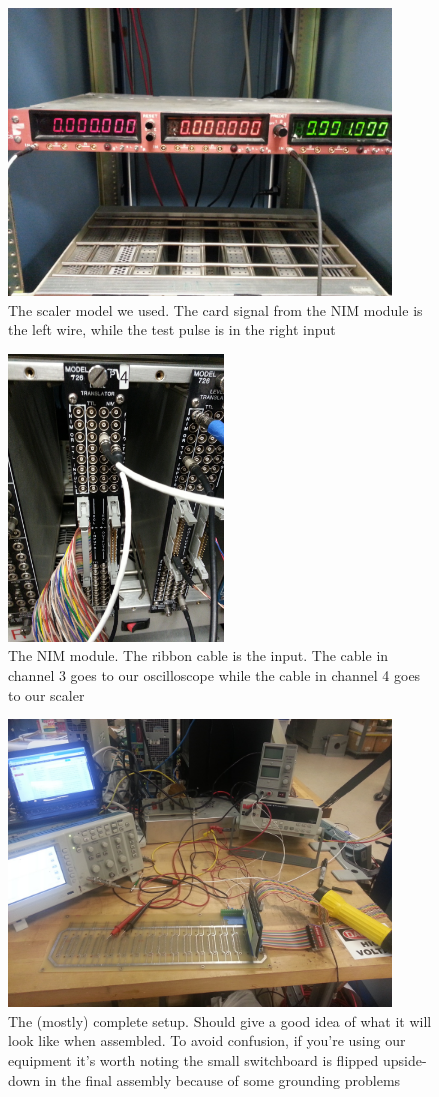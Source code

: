 \documentclass[final]{report}
\begin{document}
\begin{figure}[3]
  \centering
  \includegraphics[height=3in]{Figure3.jpg}
  \caption{The scaler model we used. The card signal from the NIM module is the left wire, while the test pulse is in the right input}
  \label{fig:scaler}
\end{figure}
\begin{figure}[4]
  \centering
  \includegraphics[height=3in, angle = -90]{Figure4.jpg}
  \caption{The NIM module. The ribbon cable is the input. The cable in channel 3 goes to our oscilloscope while the cable in channel 4 goes to our scaler}
  \label{fig:nimboard}
\end{figure}
\begin{figure}[5]
  \centering
  \includegraphics[height=3in]{Figure5.jpg}
  \caption{The (mostly) complete setup. Should give a good idea of what it will look like when assembled. To avoid confusion, if you're using our equipment it's worth noting the small switchboard is flipped upside-down in the final assembly because of some grounding problems}
  \label{fig:assembly}
\end{figure}
\end{document}
